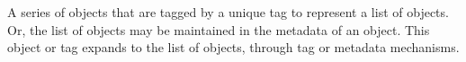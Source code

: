 A series of objects that are tagged by a unique tag to represent a list of objects. Or, the list of objects may be maintained in the metadata of an object. This object or tag expands to the list of objects, through tag or metadata mechanisms.